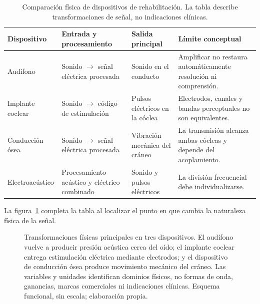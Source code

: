 \begin{table}[htbp]
    \centering
    \caption{Comparación física de dispositivos de rehabilitación. La tabla
    describe transformaciones de señal, no indicaciones clínicas.}
    \label{tab:u8-dispositivos}
    \small
    \setlength{\tabcolsep}{3pt}
    \begin{tabular}{
        >{\raggedright\arraybackslash}p{}
        >{\raggedright\arraybackslash}p{}
        >{\raggedright\arraybackslash}p{}
        >{\raggedright\arraybackslash}p{}}
        \hline
        \textbf{Dispositivo} & \textbf{Entrada y procesamiento} &
        \textbf{Salida principal} & \textbf{Límite conceptual} \\
        \hline
        Audífono &
        Sonido \(\rightarrow\) señal eléctrica procesada &
        Sonido en el conducto &
        Amplificar no restaura automáticamente resolución ni comprensión. \\
        Implante coclear &
        Sonido \(\rightarrow\) código de estimulación &
        Pulsos eléctricos en la cóclea &
        Electrodos, canales y bandas perceptuales no son equivalentes. \\
        Conducción ósea &
        Sonido \(\rightarrow\) señal eléctrica procesada &
        Vibración mecánica del cráneo &
        La transmisión alcanza ambas cócleas y depende del acoplamiento. \\
        Electroacústico &
        Procesamiento acústico y eléctrico combinado &
        Sonido y pulsos eléctricos &
        La división frecuencial debe individualizarse. \\
        \hline
    \end{tabular}
\end{table}

La figura~\ref{fig:u8-cadenas-dispositivos} completa la tabla al localizar el
punto en que cambia la naturaleza física de la señal.

\begin{figure}[htbp]
    \centering
    \resizebox{\textwidth}{!}{%
    }
    \caption{Transformaciones físicas principales en tres dispositivos. El
    audífono vuelve a producir presión acústica cerca del oído; el implante
    coclear entrega estimulación eléctrica mediante electrodos; y el
    dispositivo de conducción ósea produce movimiento mecánico del cráneo.
    Las variables y unidades identifican dominios físicos, no formas de onda,
    ganancias, marcas comerciales ni indicaciones clínicas. Esquema
    funcional, sin escala; elaboración propia.}
    \label{fig:u8-cadenas-dispositivos}
\end{figure}

